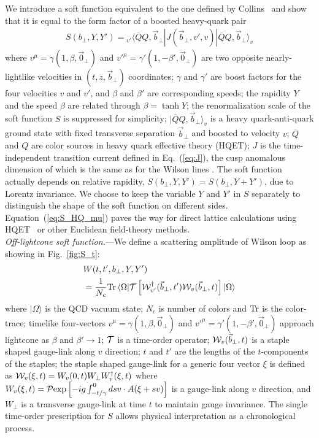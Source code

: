 \documentclass[twocolumn,aps,preprintnumbers,prd,superscriptaddress,10pt]{revtex4-1}
\begin{document}
We introduce a soft function equivalent to the one defined by Collins~\cite{Collins:2011zzd,Collins:2011ca} and show that it is equal to the form factor of a boosted heavy-quark pair
\begin{align}\label{eq:S_HQ_mu}
S(b_\perp,Y,Y')= {}_{v'}\langle\overline QQ,\vec{b}_\perp|J(\vec{b}_\perp,v',v)|\overline QQ,{\vec b}_\perp\rangle_v
\end{align}
where $v^\mu=\gamma(1,\beta,\vec 0_\perp)$ and $v'^\mu=\gamma'(1,-\beta',\vec 0_\perp)$ are two opposite nearly-lightlike velocities in $(t,z,\vec b_\perp)$ coordinates;
$\gamma$ and $\gamma'$ are boost factors for the four velocities $v$ and $v'$, and $\beta$ and $\beta'$ are corresponding speeds;
the rapidity $Y$ and the speed $\beta$ are related through $\beta=\tanh Y$;
the renormalization scale of the soft function $S$ is suppressed for simplicity;
$|\overline QQ,\vec{b}_\perp\rangle_v$ is a heavy quark-anti-quark ground state with fixed transverse separation ${\vec b}_\perp$ and boosted to velocity $v$;
$\overline Q$ and $Q$ are color sources in heavy quark effective theory (HQET);
$J$ is the time-independent transition current defined in Eq.~(\ref{eq:J}), the cusp anomalous dimension of which is the same as for the Wilson lines \cite{Korchemsky:1987wg,Korchemsky:1991zp,Ji:1991az,Grozin:2015kna}.
%
The soft function actually depends on relative rapidity, $S(b_\perp,Y,Y')=S(b_\perp,Y+Y')$, due to Lorentz invariance.
%
We choose to keep the variable $Y$ and $Y'$ in $S$ separately to distinguish the shape of the soft function on different sides.
%
Equation~(\ref{eq:S_HQ_mu}) paves the way for direct lattice calculations using HQET~\cite{Aglietti:1993hf,Hashimoto:1995in,Horgan:2009ti}
or other Euclidean field-theory methods. \\

{\it Off-lightcone soft function.}---We define a scattering amplitude of Wilson loop as showing in Fig.~\ref{fig:S_t}:
\begin{align}\label{eq:W_t}
&W(t,t',b_\perp,Y,Y')\nonumber \\
&=\frac{1}{N_c}{\rm Tr\,}\langle\Omega|{\cal T} \left[{\cal W}^{\dagger}_{v'}(\vec{b}_\perp,t'){\cal W}_{v}(\vec{b}_\perp,t)\right]|\Omega\rangle
\end{align}
where $|\Omega\rangle$ is the QCD vacuum state;
$N_c$ is number of colors and ${\rm Tr}$ is the color-trace;
timelike four-vectors $v^\mu=\gamma(1,\beta,\vec 0_\perp)$ and $v'^\mu=\gamma'(1,-\beta',\vec 0_\perp)$ approach lightcone as $\beta$ and $\beta' \to 1$;
$\cal T$ is a time-order operator;
${\cal W}_{v}(\vec{b}_\perp,t)$ is a staple shaped gauge-link along $v$ direction;
$t$ and $t'$ are the lengths of the $t$-components of the staples;
the staple shaped gauge-link for a generic four vector $\xi$ is defined as ${\cal W}_v(\xi,t)=W_v(0,t)W_\perp W^{\dagger}_v(\xi,t)$ where $W_v(\xi,t)={\cal P}{\rm exp}\left[-ig\int^0_{-t/\gamma} ds v\cdot A(\xi+sv)\right]$ is a gauge-link along $v$ direction, and $W_\perp$ is a transverse gauge-link at time $t$ to maintain gauge invariance.
%
The single time-order prescription for $S$ allows physical interpretation as a chronological process.
\end{document}
